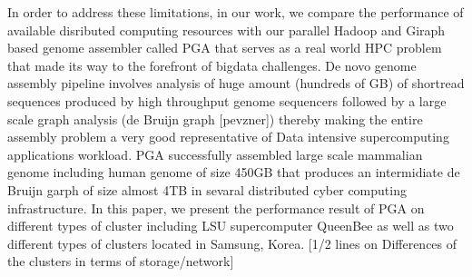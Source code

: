 In order to address these limitations, in our work, we compare the performance of available disributed computing resources with our parallel Hadoop and Giraph based genome assembler called PGA that serves as a real world HPC problem that made its way to the forefront of bigdata challenges. 
De novo genome assembly pipeline involves analysis of huge amount (hundreds of GB) of shortread sequences produced by high throughput genome sequencers followed by a large scale graph analysis (de Bruijn graph [pevzner]) thereby making the entire assembly problem a very good representative of Data intensive supercomputing applications workload.  
PGA successfully assembled large scale mammalian genome including human genome of size 450GB that produces an intermidiate de Bruijn garph of size almost 4TB in sevaral distributed cyber computing infrastructure. 
In this paper, we present the performance result of PGA on different types of cluster including LSU supercomputer QueenBee as well as two different types of clusters located in Samsung, Korea.
[1/2 lines on Differences of the clusters in terms of storage/network]
